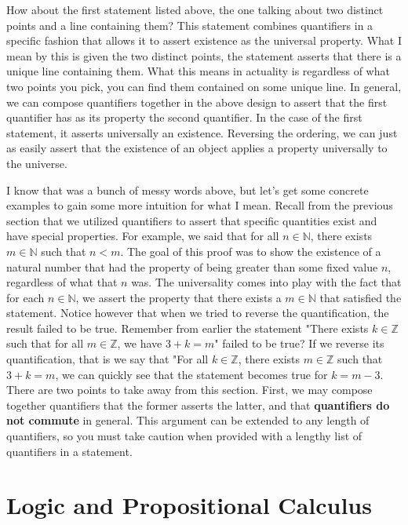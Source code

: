 \documentclass[12pt]{book}
\def\N{{\mathbb{N}}}
\def\Z{{\mathbb{Z}}}
\begin{document}
	How about the first statement listed above, the one talking about two distinct points and a line containing them? This statement combines quantifiers in a specific fashion that allows it to assert existence as the universal property. What I mean by this is given the two distinct points, the statement asserts that there is a unique line containing them. What this means in actuality is regardless of what two points you pick, you can find them contained on some unique line. In general, we can compose quantifiers together in the above design to assert that the first quantifier has as its property the second quantifier. In the case of the first statement, it asserts universally an existence. Reversing the ordering, we can just as easily assert that the existence of an object applies a property universally to the universe. 
	
	I know that was a bunch of messy words above, but let's get some concrete examples to gain some more intuition for what I mean. Recall from the previous section that we utilized quantifiers to assert that specific quantities exist and have special properties. For example, we said that for all $n\in\N$, there exists $m\in\N$ such that $n<m$. The goal of this proof was to show the existence of a natural number that had the property of being greater than some fixed value $n$, regardless of what that $n$ was. The universality comes into play with the fact that for each $n\in\N$, we assert the property that there exists a $m\in\N$ that satisfied the statement. Notice however that when we tried to reverse the quantification, the result failed to be true. Remember from earlier the statement "There exists $k\in\Z$ such that for all $m\in\Z$, we have $3+k=m$" failed to be true? If we reverse its quantification, that is we say that "For all $k\in\Z$, there exists $m\in\Z$ such that $3+k=m$, we can quickly see that the statement becomes true for $k=m-3$. There are two points to take away from this section. First, we may compose together quantifiers that the former asserts the latter, and that \textbf{quantifiers do not commute} in general. This argument can be extended to any length of quantifiers, so you must take caution when provided with a lengthy list of quantifiers in a statement.

\section{Logic and Propositional Calculus}
\label{sec:propcalc}
\end{document}
